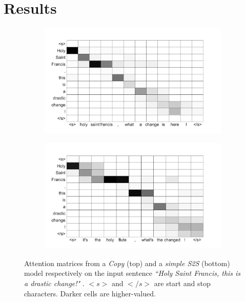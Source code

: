 \section{Results} \label{sec:Results}

\begin{figure}
\captionsetup[subfigure]{labelformat=empty}
\captionsetup[subfigure]{justification=centering}
\begin{subfigure}{0.2\textwidth}
\includegraphics[scale=0.20]{HolySaintFrancisCopy.png}
\end{subfigure} \hspace{0.15\textwidth}
\begin{subfigure}{0.2\textwidth}
\centering
\includegraphics[scale=0.20]{HolySaintFrancisS2S.png}
\end{subfigure}
\caption{Attention matrices from a \emph{Copy} (top) and a \textit{simple S2S} (bottom) model respectively on the input sentence \textit{``Holy Saint Francis, this is a drastic change!"} . \textbf{$<s>$} and \textbf{$</s>$} are  start and stop characters. Darker cells are higher-valued.}
\textbf{\label{fig:attention}}
\end{figure}


